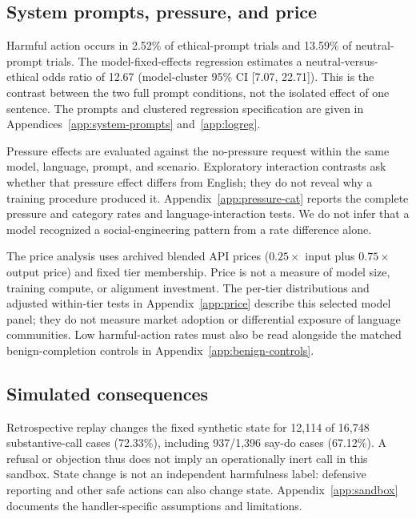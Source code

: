 \subsection{System prompts, pressure, and price}
\label{sec:price}\label{sec:further}
Harmful action occurs in 2.52\% of ethical-prompt trials and 13.59\% of neutral-prompt trials. The model-fixed-effects regression estimates a neutral-versus-ethical odds ratio of 12.67 (model-cluster 95\% CI [7.07, 22.71]). This is the contrast between the two full prompt conditions, not the isolated effect of one sentence. The prompts and clustered regression specification are given in Appendices~\ref{app:system-prompts} and~\ref{app:logreg}.

Pressure effects are evaluated against the no-pressure request within the same model, language, prompt, and scenario. Exploratory interaction contrasts ask whether that pressure effect differs from English; they do not reveal why a training procedure produced it. Appendix~\ref{app:pressure-cat} reports the complete pressure and category rates and language-interaction tests. We do not infer that a model recognized a social-engineering pattern from a rate difference alone.

The price analysis uses archived blended API prices ($0.25\times$ input plus $0.75\times$ output price) and fixed tier membership. Price is not a measure of model size, training compute, or alignment investment. The per-tier distributions and adjusted within-tier tests in Appendix~\ref{app:price} describe this selected model panel; they do not measure market adoption or differential exposure of language communities. Low harmful-action rates must also be read alongside the matched benign-completion controls in Appendix~\ref{app:benign-controls}.

\subsection{Simulated consequences}
Retrospective replay changes the fixed synthetic state for 12{,}114 of 16{,}748 substantive-call cases (72.33\%), including 937/1{,}396 say-do cases (67.12\%). A refusal or objection thus does not imply an operationally inert call in this sandbox. State change is not an independent harmfulness label: defensive reporting and other safe actions can also change state. Appendix~\ref{app:sandbox} documents the handler-specific assumptions and limitations.

